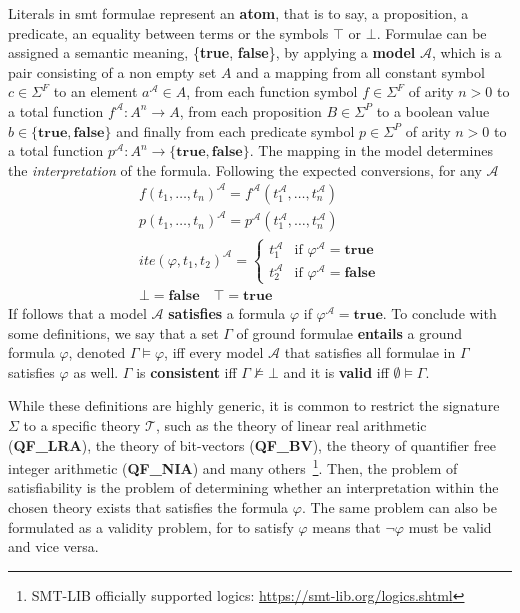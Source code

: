 \documentclass[runningheads]{llncs}
\begin{document}
Literals in \gls{smt} formulae represent an \textbf{atom}, that is to say, a proposition, a predicate, an equality between terms or the symbols $\top$ or $\bot$.
Formulae can be assigned a semantic meaning, \{\textbf{true}, \textbf{false}\}, by applying a \textbf{model} $\mathcal{A}$, which is a pair consisting of a non empty set $A$ and a mapping from all constant symbol $c \in \Sigma^F$ to an element $a^\mathcal{A} \in A$, from each function symbol $f \in \Sigma^F$ of arity $n > 0$ to a total function $f^\mathcal{A} : A^n \to A$, from each proposition $B \in \Sigma^{P}$ to a boolean value $b \in \{\textbf{true}, \textbf{false}\}$ and finally from each predicate symbol $p \in \Sigma^P$ of arity $n > 0$ to a total function $p^\mathcal{A} : A^n \to \{ \textbf{true}, \textbf{false} \}$.
The mapping in the model determines the \textit{interpretation} of the formula.
Following the expected conversions, for any $\mathcal{A}$
\begin{gather*}
    f(t_1, \dots, t_n)^{\mathcal{A}} = f^{\mathcal{A}}(t_1^{\mathcal{A}}, \dots, t_n^{\mathcal{A}}) \\
    p(t_1, \dots, t_n)^{\mathcal{A}} = p^{\mathcal{A}}(t_1^{\mathcal{A}}, \dots, t_n^{\mathcal{A}}) \\
    ite(\varphi, t_1, t_2)^{\mathcal{A}} = \begin{cases}
        t_1^{\mathcal{A}} & \text{if } \varphi^{\mathcal{A}} = \textbf{true}  \\
        t_2^{\mathcal{A}} & \text{if } \varphi^{\mathcal{A}} = \textbf{false}
    \end{cases} \\
    \bot = \textbf{false} \quad \top = \textbf{true}
\end{gather*}
If follows that a model $\mathcal{A}$ \textbf{satisfies} a formula $\varphi$ if $\varphi^{\mathcal{A}} = \textbf{true}$.
To conclude with some definitions, we say that a set $\Gamma$ of ground formulae \textbf{entails} a ground formula $\varphi$, denoted $\Gamma \models \varphi$, iff every model $\mathcal{A}$ that satisfies all formulae in $\Gamma$ satisfies $\varphi$ as well.
$\Gamma$ is \textbf{consistent} iff $\Gamma \not\models \bot$ and it is \textbf{valid} iff $\emptyset \models \Gamma$.

While these definitions are highly generic, it is common to restrict the signature $\Sigma$ to a specific theory $\mathcal{T}$, such as the theory of linear real arithmetic (\textbf{QF\_LRA}), the theory of bit-vectors (\textbf{QF\_BV}), the theory of quantifier free integer arithmetic (\textbf{QF\_NIA}) and many others~\footnote{SMT-LIB officially supported logics: \url{https://smt-lib.org/logics.shtml}}.
Then, the problem of satisfiability is the problem of determining whether an interpretation within the chosen theory exists that satisfies the formula $\varphi$.
The same problem can also be formulated as a validity problem, for to satisfy $\varphi$ means that $\neg\varphi$ must be valid and vice versa.
\end{document}
